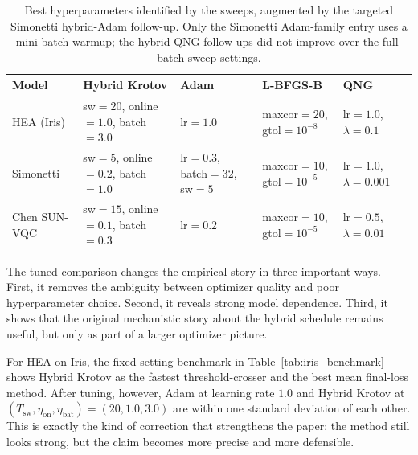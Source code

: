 \documentclass[aps,prb,10pt,twocolumn,superscriptaddress]{revtex4-2}
\begin{document}
\begin{table}[t]
\centering
\small
\begin{tabular}{>{\raggedright\arraybackslash}p{2.7cm}
                >{\raggedright\arraybackslash}p{2.9cm}
                >{\raggedright\arraybackslash}p{2.2cm}
                >{\raggedright\arraybackslash}p{2.4cm}
                >{\raggedright\arraybackslash}p{2.4cm}}
\toprule
Model & Hybrid Krotov & Adam & L-BFGS-B & QNG \\
\midrule
HEA (Iris)
  & sw\(=20\), online\(=1.0\), batch\(=3.0\)
  & lr\(=1.0\)
  & maxcor\(=20\), gtol\(=10^{-8}\)
  & lr\(=1.0\), \(\lambda=0.1\) \\
Simonetti
  & sw\(=5\), online\(=0.2\), batch\(=1.0\)
  & lr\(=0.3\), batch\(=32\), sw\(=5\)
  & maxcor\(=10\), gtol\(=10^{-5}\)
  & lr\(=1.0\), \(\lambda=0.001\) \\
Chen SUN-VQC
  & sw\(=15\), online\(=0.1\), batch\(=0.3\)
  & lr\(=0.2\)
  & maxcor\(=10\), gtol\(=10^{-5}\)
  & lr\(=0.5\), \(\lambda=0.01\) \\
\bottomrule
\end{tabular}
\caption{Best hyperparameters identified by the sweeps, augmented by the targeted Simonetti hybrid-Adam follow-up. Only the Simonetti Adam-family entry uses a mini-batch warmup; the hybrid-QNG follow-ups did not improve over the full-batch sweep settings.}
\label{tab:best_hparams}
\end{table}

The tuned comparison changes the empirical story in three important ways.
First, it removes the ambiguity between optimizer quality and poor hyperparameter choice.
Second, it reveals strong model dependence.
Third, it shows that the original mechanistic story about the hybrid schedule remains useful, but only as part of a larger optimizer picture.

For HEA on Iris, the fixed-setting benchmark in Table~\ref{tab:iris_benchmark} shows Hybrid Krotov as the fastest threshold-crosser and the best mean final-loss method.
After tuning, however, Adam at learning rate \(1.0\) and Hybrid Krotov at \((T_{\mathrm{sw}},\eta_{\mathrm{on}},\eta_{\mathrm{bat}})=(20,1.0,3.0)\) are within one standard deviation of each other.
This is exactly the kind of correction that strengthens the paper: the method still looks strong, but the claim becomes more precise and more defensible.
\end{document}
